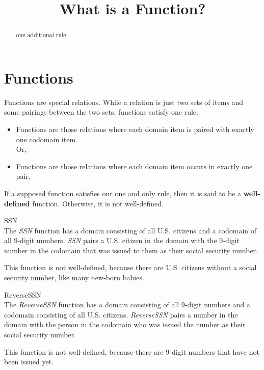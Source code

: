 \documentclass{ximera}
\title{What is a Function?}
\begin{document}
\begin{abstract}
one additional rule
\end{abstract}
\maketitle




\section{Functions}

Functions are special relations. While a relation is just two sets of items and some pairings between the two sets, functions satisfy one rule. 

\begin{itemize}
\item Functions are those relations where each domain item is paired with exactly one codomain item. \\ Or, 
\item Functions are those relations where each domain item occurs in exactly one pair.
\end{itemize}


If a supposed function satisfies our one and only rule, then it is said to be a \textbf{well-defined} function.  Otherwise, it is not well-defined.


\begin{example} SSN \\
The \textit{SSN} function has a domain consisting of all U.S. citizens and a codomain of all 9-digit numbers.  \textit{SSN} pairs a U.S. citizen in the domain with the 9-digit number in the codomain that was issued to them as their social security number. 

This function is not well-defined, because there are U.S. citizens without a social security number, like many new-born babies.
\end{example}


\begin{example} ReverseSSN \\
The \textit{ReverseSSN} function has a domain consisting of all 9-digit numbers and a codomain consisting of all U.S. citizens.  \textit{ReverseSSN} pairs a number in the domain with the person in the codomain who was issued the number as their social security number. 

This function is not well-defined, because there are 9-digit numbers that have not been issued yet.
\end{example}
\end{document}
